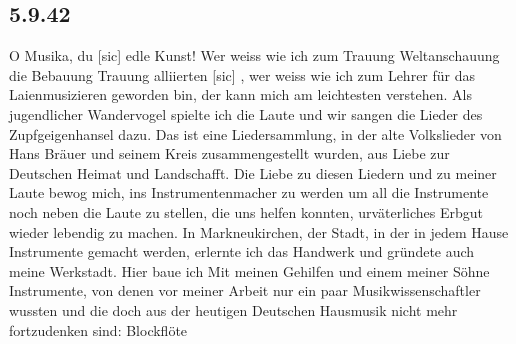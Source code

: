 \subsection{5.9.42}

O Musika, du{\color{red} [sic] } edle Kunst!
Wer weiss wie ich zum  Trauung  Weltanschauung  die Bebauung Trauung  alliierten {\color{red} [sic] }, wer weiss wie ich zum Lehrer f\"{u}r das Laienmusizieren geworden bin, der kann mich am leichtesten verstehen.
Als jugendlicher Wandervogel spielte ich die Laute und wir sangen die Lieder des Zupfgeigenhansel dazu.
Das ist eine Liedersammlung, in der alte Volkslieder von Hans Br\"{a}uer und seinem Kreis zusammengestellt wurden, aus Liebe zur Deutschen Heimat und Landschafft.
Die Liebe zu diesen Liedern und zu meiner Laute bewog mich, ins Instrumentenmacher zu werden um all die Instrumente noch neben die Laute zu stellen, die uns helfen konnten, urv\"{a}terliches Erbgut wieder lebendig zu machen.
In Markneukirchen, der Stadt, in der in jedem Hause Instrumente gemacht werden, erlernte ich das Handwerk und gr\"{u}ndete auch meine Werkstadt.
Hier baue ich Mit meinen Gehilfen und einem meiner S\"{o}hne Instrumente, von denen vor meiner Arbeit nur ein paar Musikwissenschaftler wussten und die doch aus der heutigen Deutschen Hausmusik nicht mehr fortzudenken sind: Blockfl\"{o}te


\clearpage
